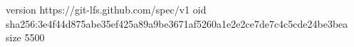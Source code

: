 version https://git-lfs.github.com/spec/v1
oid sha256:3e4f44d875abe35ef425a89a9be3671af5260a1e2e2ce7de7c4c5cde24be3bea
size 5500
